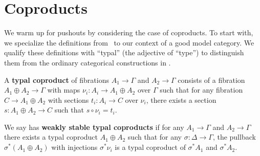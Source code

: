 \documentclass[referee]{psp}
\let\sec\S
\let\S\cS
\begin{document}




\section{Coproducts}
\label{sec:coproducts}

We warm up for pushouts by considering the case of coproducts.
To start with, we specialize the definitions from~\cite[\sec3.4.1]{lw:localuniv} to our context of a good model category.
We qualify these definitions with ``typal'' (the adjective of ``type'') to distinguish them from the ordinary categorical constructions in \sM.

\begin{defn}\label{defn:sum}
  A \textbf{typal coproduct} of fibrations $A_1\to \Gamma$ and $A_2\to\Gamma$ consists of a fibration $A_1\oplus A_2 \to\Gamma$ with maps $\nu_i: A_i \to A_1\oplus A_2$ over $\Gamma$ such that for any fibration $C\to A_1\oplus A_2$ with sections $t_i : A_i \to C$ over $\nu_i$, there exists a section $s:A_1\oplus A_2 \to C$ such that $s\circ \nu_i = t_i$.

  We say \sM has \textbf{weakly stable typal coproducts} if for any $A_1\to \Gamma$ and $A_2\to\Gamma$ there exists a typal coproduct $A_1\oplus A_2$ such that for any $\sigma:\Delta\to\Gamma$, the pullback $\sigma^*(A_1\oplus A_2)$ with injections $\sigma^*\nu_i$ is a typal coproduct of $\sigma^*A_1$ and $\sigma^* A_2$.
\end{defn}
\end{document}
